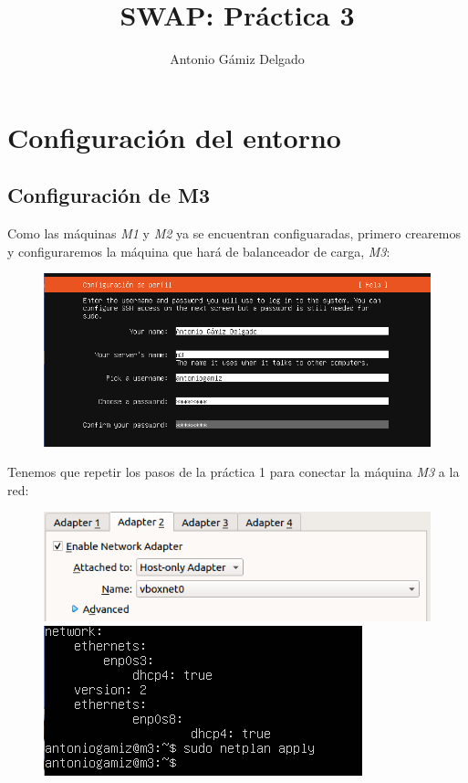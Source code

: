 \documentclass[12pt]{article}
\title{SWAP: Práctica 3}
\author{
        Antonio Gámiz Delgado
}
\begin{document}
\maketitle

\section{Configuración del entorno}

\subsection{Configuración de M3}

Como las máquinas \textit{M1} y \textit{M2} ya se encuentran configuaradas, primero crearemos y configuraremos la máquina que hará de balanceador de carga, \textit{M3}:

\begin{figure}[H]
\center
\includegraphics[scale=0.5]{1.png}
\end{figure}

Tenemos que repetir los pasos de la práctica 1 para conectar la máquina \textit{M3} a la red:

\begin{figure}[H]
\includegraphics[scale=0.5]{2.png}
\includegraphics[scale=0.5]{3.png}
\end{figure}
\end{document}
